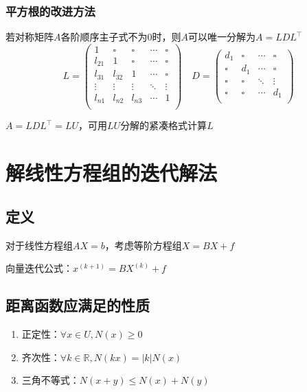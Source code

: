 \documentclass[UTF8,a4paper,11pt,oneside]{ctexbook}
\begin{document}
\subsection{平方根的改进方法}

若对称矩阵\(A\)各阶顺序主子式不为0时，则\(A\)可以唯一分解为\(A=LDL^\top\)
\[
L=
\begin{pmatrix}
    1 & \square & \square & \cdots & \square\\
    l_{21} & 1 & \square & \cdots & \square\\
    l_{31} & l_{32} & 1 & \cdots & \square\\
    \vdots & \vdots & \vdots & \ddots & \vdots\\
    l_{n1} & l_{n2} & l_{n3} & \cdots & 1\\
\end{pmatrix}
\quad
D=
\begin{pmatrix}
    d_1 & \square & \cdots & \square\\
    \square & d_1 & \cdots & \square\\
    \square & \square & \ddots & \vdots\\
    \square & \square & \cdots & d_1\\
\end{pmatrix}
\]

\(A=LDL^\top=LU\)，可用\(LU\)分解的紧凑格式计算\(L\)

\chapter{解线性方程组的迭代解法}

\section{定义}

对于线性方程组\(AX=b\)，考虑等阶方程组\(X=BX+f\)

向量迭代公式：\(x^{(k+1)}=BX^{(k)}+f\)

\section{距离函数应满足的性质}
\begin{enumerate}
    \item 正定性：\(\forall x\in U,N(x)\geq0\)
    \item 齐次性：\(\forall k\in\mathbb{R},N(kx)=|k|N(x)\)
    \item 三角不等式：\(N(x+y)\leq N(x)+N(y)\)
\end{enumerate}
\end{document}
